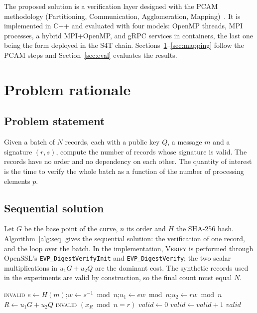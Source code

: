 \documentclass[10pt,a4paper]{article}
\begin{document}
The proposed solution is a verification layer designed with the PCAM methodology (Partitioning, Communication, Agglomeration, Mapping)~\cite{foster}. It is implemented in C++ and evaluated with four models: OpenMP threads, MPI processes, a hybrid MPI+OpenMP, and gRPC services in containers, the last one being the form deployed in the S4T chain. Sections~\ref{sec:problem}--\ref{sec:mapping} follow the PCAM steps and Section~\ref{sec:eval} evaluates the results.

\section{Problem rationale}\label{sec:problem}

\subsection{Problem statement}

Given a batch of $N$ records, each with a public key $Q$, a message $m$ and a signature $(r,s)$, compute the number of records whose signature is valid. The records have no order and no dependency on each other. The quantity of interest is the time to verify the whole batch as a function of the number of processing elements $p$.

\subsection{Sequential solution}

Let $G$ be the base point of the curve, $n$ its order and $H$ the SHA-256 hash. Algorithm~\ref{alg:seq} gives the sequential solution: the verification of one record, and the loop over the batch. In the implementation, \textsc{Verify} is performed through OpenSSL's \texttt{EVP\_DigestVerifyInit} and \texttt{EVP\_DigestVerify}; the two scalar multiplications in $u_1G+u_2Q$ are the dominant cost. The synthetic records used in the experiments are valid by construction, so the final count must equal $N$.

\begin{algorithm}[t]
\caption{Sequential verification of a batch (reference baseline, time $T_1$)}
\label{alg:seq}
\begin{algorithmic}[1]
   \State \Return \textsc{invalid} \EndIf
  \State $e \gets H(m)$;\quad $w \gets s^{-1} \bmod n$;\quad $u_1 \gets ew \bmod n$;\quad $u_2 \gets rw \bmod n$
  \State $R \gets u_1 G + u_2 Q$
   \State \Return \textsc{invalid} \EndIf
  \State \Return $(x_R \bmod n = r)$
\EndFunction
\Statex
\State $\textit{valid} \gets 0$
   \State $\textit{valid} \gets \textit{valid} + 1$ \EndIf
\EndFor
\State \Return $\textit{valid}$
\end{algorithmic}
\end{algorithm}
\end{document}
